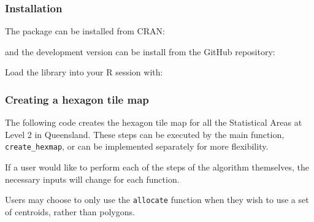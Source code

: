 \documentclass{monashthesis}
\begin{document}
\hypertarget{installation}{%
\subsubsection{Installation}\label{installation}}

The package can be installed from CRAN:

and the development version can be install from the GitHub repository:

Load the library into your R session with:

\hypertarget{creating-a-hexagon-tile-map}{%
\subsubsection{Creating a hexagon tile map}\label{creating-a-hexagon-tile-map}}

The following code creates the hexagon tile map for all the Statistical Areas at Level 2 in Queensland. These steps can be executed by the main function, \texttt{create\_hexmap}, or can be implemented separately for more flexibility.

If a user would like to perform each of the steps of the algorithm themselves, the necessary inputs will change for each function.

Users may choose to only use the \texttt{allocate} function when they wish to use a set of centroids, rather than \autocite{sf} polygons.
\end{document}

